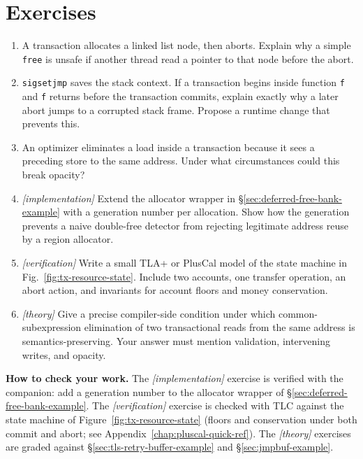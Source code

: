 \section{Exercises}
\begin{enumerate}
    \item A transaction allocates a linked list node, then aborts. Explain why a simple \texttt{free} is unsafe if another thread read a pointer to that node before the abort.
    \item \texttt{sigsetjmp} saves the stack context. If a transaction begins inside function \texttt{f} and \texttt{f} returns before the transaction commits, explain exactly why a later abort jumps to a corrupted stack frame. Propose a runtime change that prevents this.
    \item An optimizer eliminates a load inside a transaction because it sees a preceding store to the same address. Under what circumstances could this break opacity?
    \item \emph{[implementation]} Extend the allocator wrapper in \S\ref{sec:deferred-free-bank-example} with a generation number per allocation.  Show how the generation prevents a naive double-free detector from rejecting legitimate address reuse by a region allocator.
    \item \emph{[verification]} Write a small TLA+ or PlusCal model of the state machine in Fig.~\ref{fig:tx-resource-state}.  Include two accounts, one transfer operation, an abort action, and invariants for account floors and money conservation.
    \item \emph{[theory]} Give a precise compiler-side condition under which common-subexpression elimination of two transactional reads from the same address is semantics-preserving.  Your answer must mention validation, intervening writes, and opacity.
\end{enumerate}

\textbf{How to check your work.} The \emph{[implementation]} exercise is
verified with the companion: add a generation number to the allocator wrapper
of \S\ref{sec:deferred-free-bank-example}.  The \emph{[verification]}
exercise is checked with TLC against the state machine of
Figure~\ref{fig:tx-resource-state} (floors and conservation under both commit
and abort; see Appendix~\ref{chap:pluscal-quick-ref}).  The
\emph{[theory]} exercises are graded against \S\ref{sec:tls-retry-buffer-example}
and \S\ref{sec:jmpbuf-example}.

